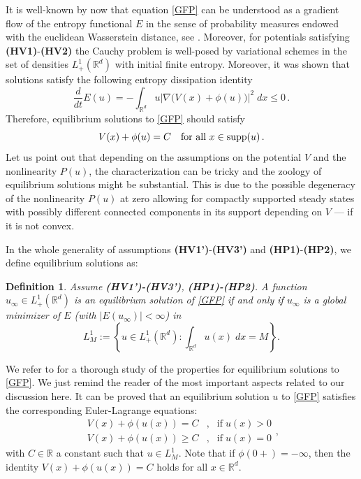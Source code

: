 \documentclass[reqno]{amsart}
\newtheorem{definition}[lemma]{Definition}
\newcommand{\R}{\mathbb{R}}
\newcommand{\uinf}{u_\infty}
\begin{document}
It is well-known by now that equation \eqref{GFP} can be understood as a gradient flow of the entropy functional $E$ in the sense of probability measures endowed with the euclidean Wasserstein distance, see \cite{jko,otto, AGS,CMCV06}. Moreover, for potentials satisfying {\bf (HV1)}-{\bf (HV2)} the Cauchy problem is well-posed by variational schemes in the set of densities $L^1_+(\R^d)$ with initial finite entropy. Moreover, it was shown that solutions satisfy the following entropy dissipation identity
\begin{equation*}%
  \frac{d}{dt} E(u) = - \int_{\R^d} u \big|\nabla\big(V(x) +  \phi(u)\big)\big|^2 \;dx\leq 0\,.
\end{equation*}
Therefore, equilibrium solutions to \eqref{GFP} should satisfy
\begin{equation*}%
  V(x) +  \phi(u) = C \quad \mbox{for all } x\in\mbox{\rm supp}(u)\,.
\end{equation*}
Let us point out that depending on the assumptions on the potential $V$ and the nonlinearity $P(u)$, the characterization can be tricky and the zoology of equilibrium solutions might be substantial. This is due to the possible degeneracy of the nonlinearity $P(u)$ at zero allowing for compactly supported steady states with possibly different connected components in its support depending on $V$ --- if it is not convex. 

In the whole generality of assumptions {\bf (HV1')}-{\bf (HV3')} and {\bf (HP1)}-{\bf (HP2)}, we define equilibrium solutions as:

\begin{definition}%
Assume {\bf (HV1')-(HV3')}, {\bf (HP1)-(HP2)}. A function $\uinf \in L^1_+(\R^d)$ is an {\rm equilibrium} solution of \eqref{GFP} if and only if $\uinf$ is a global minimizer of $E$ (with $|E(u_\infty)|<\infty$) in 
\[ 
L^1_M:= \left\{ u\in L^1_+(\R^d): \int_{\R^d} u(x)\;dx = M \right\}.
\]
\end{definition}

We refer to \cite[Subsection 3.1]{CJMTU} for a thorough study of the properties for equilibrium solutions to \eqref{GFP}. We just remind the reader of the most important aspects related to our discussion here. It can be proved that an equilibrium solution $u$ to \eqref{GFP} satisfies the corresponding Euler-Lagrange equations:
\begin{equation}\label{stat2} 
\begin{array}{rcl} V(x)+\phi(u(x)) = C & , &\mbox{if}\; u(x)>0 
\\ V(x)+\phi(u(x)) \ge C& , &\mbox{if}\; u(x) =0
\end{array},\end{equation}
with $C\in\R$ a constant such that $u\in L^1_M$. Note that if $\phi(0+)=-\infty$, then the identity $V(x)+\phi(u(x))=C$ holds for all  $x\in\R^d$.
\end{document}
